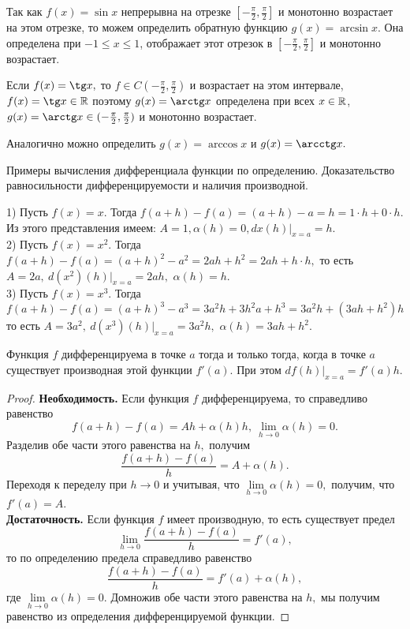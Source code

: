 Так как $f(x)=\sin x$ непрерывна на отрезке
$[-\frac{\pi}{2}, \frac{\pi}{2}]$ и
монотонно возрастает на этом отрезке,
то можем определить обратную
функцию $g(x) = \arcsin x$. Она определена при
$-1 \leq x \leq 1$, отображает этот отрезок в
$[-\frac{\pi}{2}, \frac{\pi}{2}]$ и монотонно возрастает.

Если $f(x)=\tg x,$ то $f \in C(-\frac{\pi}{2},
    \frac{\pi}{2})$ и возрастает на этом интервале,
$f(x)=\tg x \in \R$ поэтому $g(x)=\arctg x$ определена
при всех $x \in \mathbb{R}$, $g(x)=\arctg x \in (-\frac{\pi}{2},
    \frac{\pi}{2})$ и монотонно возрастает.

Аналогично можно определить $g(x)=\arccos x$ и
$g(x)=\arcctg x.$

\newpage

\begin{problem}
Примеры вычисления дифференциала функции по определению. Доказательство равносильности дифференцируемости и наличия производной.
\end{problem}

\begin{example}
    1) Пусть $f(x)=x.$
    Тогда $f(a+h)-f(a)=(a+h)-a=h=1\cdot h+0\cdot h.$
    Из этого представления имеем: $A=1,
        \alpha(h)=0, dx(h)|_{x=a}=h.$\\
    2) Пусть $f(x)=x^2.$ Тогда
    $f(a+h)-f(a)=(a+h)^2-a^2=2ah+h^2=
        2ah+h\cdot h,$ то есть $A=2a, \ d(x^2)(h)|_{x=a}=
        2ah,$ $\alpha(h)=h.$\\
    3) Пусть $f(x)=x^3.$ Тогда
    $f(a+h)-f(a)=(a+h)^3-a^3=3a^2h+3h^2a+h^3=
        3a^2h+(3ah+h^2)h$ то есть $A=3a^2, \ d(x^3)(h)|_{x=a}=
        3a^2h,$ $\alpha(h)=3ah+h^2.$
\end{example}

\begin{proposition}
    Функция $f$ дифференцируема в точке $a$
    тогда и только тогда, когда в точке
    $a$ существует производная этой функции $f'(a).$
    При этом $df(h)|_{x=a}=f'(a)h.$
\end{proposition}
\begin{proof}
    \textbf{Необходимость.} Если функция $f$
    дифференцируема,
    то справедливо равенство
    $$
        f(a+h)-f(a)=Ah+
        \alpha(h)h, \
        \lim\limits_{h\rightarrow0}\alpha(h)=0.
    $$
    Разделив обе части этого
    равенства на $h,$ получим
    $$
        \frac{f(a+h)-f(a)}{h}=A+\alpha(h).
    $$
    Переходя к переделу при $h\rightarrow0$
    и учитывая, что $\lim\limits_{h\rightarrow0}
        \alpha(h)=0,$ получим, что $f'(a)=A.$\\
    \textbf{Достаточность.} Если функция $f$
    имеет производную, то есть существует
    предел
    $$
        \lim\limits_{h\rightarrow0}
        \frac{f(a+h)-f(a)}{h}=f'(a),
    $$
    то по определению
    предела справедливо равенство
    $$
        \frac{f(a+h)-f(a)}{h}=f'(a)+\alpha(h),
    $$
    где $\lim\limits_{h\rightarrow0}
        \alpha(h)=0.$
    Домножив обе части этого равенства
    на $h,$ мы получим равенство из
    определения дифференцируемой функции.
\end{proof}

